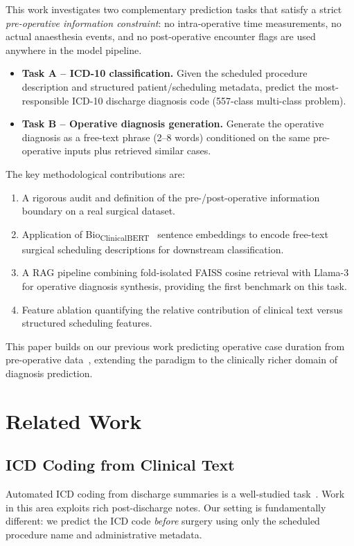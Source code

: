 \documentclass[10pt,twocolumn]{article}
\begin{document}
This work investigates two complementary prediction tasks that satisfy a strict \emph{pre-operative information constraint}: no intra-operative time measurements, no actual anaesthesia events, and no post-operative encounter flags are used anywhere in the model pipeline.

\begin{itemize}[leftmargin=*,itemsep=2pt]
  \item \textbf{Task A -- ICD-10 classification.}  Given the scheduled procedure description and structured patient/scheduling metadata, predict the most-responsible ICD-10 discharge diagnosis code (557-class multi-class problem).
  \item \textbf{Task B -- Operative diagnosis generation.}  Generate the operative diagnosis as a free-text phrase (2--8 words) conditioned on the same pre-operative inputs plus retrieved similar cases.
\end{itemize}

The key methodological contributions are:
\begin{enumerate}[leftmargin=*,itemsep=2pt]
  \item A rigorous audit and definition of the pre-/post-operative information boundary on a real surgical dataset.
  \item Application of Bio\textsubscript{ClinicalBERT}~\cite{alsentzer2019publicly} sentence embeddings to encode free-text surgical scheduling descriptions for downstream classification.
  \item A RAG pipeline combining fold-isolated FAISS cosine retrieval with Llama-3~\cite{touvron2023llama} for operative diagnosis synthesis, providing the first benchmark on this task.
  \item Feature ablation quantifying the relative contribution of clinical text versus structured scheduling features.
\end{enumerate}

This paper builds on our previous work predicting operative case duration from pre-operative data~\cite{[prevpaper]}, extending the paradigm to the clinically richer domain of diagnosis prediction.

\section{Related Work}
\label{sec:related}

\subsection{ICD Coding from Clinical Text}
Automated ICD coding from discharge summaries is a well-studied task~\cite{mullenbach2018explainable,huang2022plm,ji2021does}. Work in this area exploits rich post-discharge notes. Our setting is fundamentally different: we predict the ICD code \emph{before} surgery using only the scheduled procedure name and administrative metadata.
\end{document}
